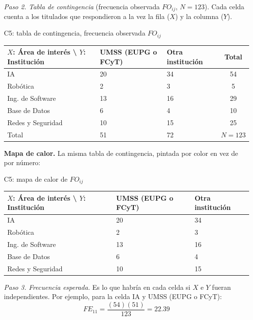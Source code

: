 \textit{Paso 2. Tabla de contingencia} (frecuencia observada $FO_{ij}$, $N = 123$). Cada celda cuenta a los titulados que respondieron a la vez la fila ($X$) y la columna ($Y$).

\begin{mitabla}{C5: tabla de contingencia, frecuencia observada $FO_{ij}$}
\begin{tabular}{L{3.8cm}C{3.00cm}C{3.00cm}|c}
\toprule
$X$: Área de interés \textbackslash{} $Y$: Institución & UMSS (EUPG o FCyT) & Otra institución & Total \\
\midrule
IA & 20 & 34 & 54 \\
Robótica & 2 & 3 & 5 \\
Ing. de Software & 13 & 16 & 29 \\
Base de Datos & 6 & 4 & 10 \\
Redes y Seguridad & 10 & 15 & 25 \\
\midrule
Total & 51 & 72 & $N = 123$ \\
\bottomrule
\end{tabular}
\end{mitabla}

\textbf{Mapa de calor.} La misma tabla de contingencia, pintada por color en vez de por número:

\begin{mitabla}{C5: mapa de calor de $FO_{ij}$}
\begin{tabular}{L{3.8cm}C{3.00cm}C{3.00cm}}
\toprule
$X$: Área de interés \textbackslash{} $Y$: Institución & UMSS (EUPG o FCyT) & Otra institución \\
\midrule
IA & 20 & 34 \\
Robótica & 2 & 3 \\
Ing. de Software & 13 & 16 \\
Base de Datos & 6 & 4 \\
Redes y Seguridad & 10 & 15 \\
\bottomrule
\end{tabular}
\end{mitabla}

\textit{Paso 3. Frecuencia esperada.} Es lo que habría en cada celda si $X$ e $Y$ fueran independientes. Por ejemplo, para la celda IA y UMSS (EUPG o FCyT):
\[
FE_{11} = \frac{(54)(51)}{123} = 22.39
\]

